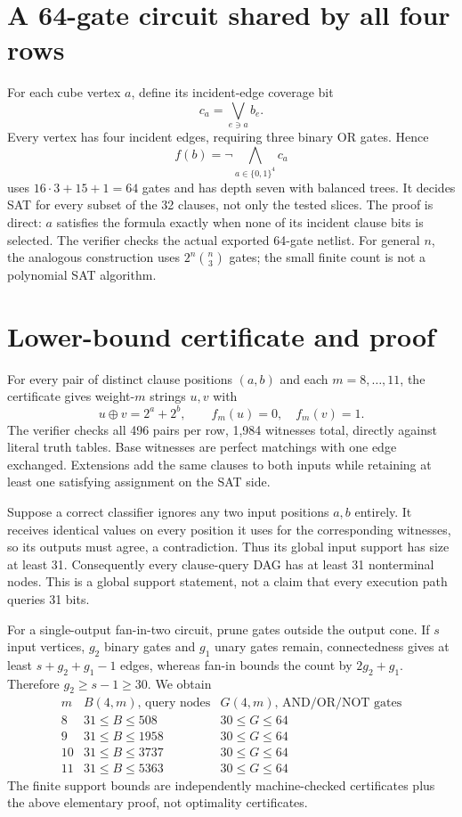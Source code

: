 \documentclass[11pt]{article}
\begin{document}
\section*{A 64-gate circuit shared by all four rows}
For each cube vertex $a$, define its incident-edge coverage bit
\[
c_a=\bigvee_{e\ni a} b_e.
\]
Every vertex has four incident edges, requiring three binary OR gates. Hence
\[
f(b)=\neg\bigwedge_{a\in\{0,1\}^4}c_a
\]
uses $16\cdot3+15+1=64$ gates and has depth seven with balanced trees.
It decides SAT for every subset of the 32 clauses, not only the tested slices.
The proof is direct: $a$ satisfies the formula exactly when none of its incident
clause bits is selected. The verifier checks the actual exported 64-gate netlist.
For general $n$, the analogous construction uses
$2^n\binom n3$ gates; the small finite count is not a polynomial SAT algorithm.

\section*{Lower-bound certificate and proof}
For every pair of distinct clause positions $(a,b)$ and each $m=8,\ldots,11$,
the certificate gives weight-$m$ strings $u,v$ with
\[
u\mathbin{\oplus}v=2^a+2^b,\qquad f_m(u)=0,\quad f_m(v)=1.
\]
The verifier checks all 496 pairs per row, 1,984 witnesses total, directly
against literal truth tables. Base witnesses are perfect matchings with one
edge exchanged. Extensions add the same clauses to both inputs while retaining
at least one satisfying assignment on the SAT side.

Suppose a correct classifier ignores any two input positions $a,b$ entirely.
It receives identical values on every position it uses for the corresponding
witnesses, so its outputs must agree, a contradiction. Thus its global input
support has size at least 31. Consequently every clause-query DAG has at least
31 nonterminal nodes. This is a global support statement, not a claim that every
execution path queries 31 bits.

For a single-output fan-in-two circuit, prune gates outside the output cone.
If $s$ input vertices, $g_2$ binary gates and $g_1$ unary gates remain, connectedness
gives at least $s+g_2+g_1-1$ edges, whereas fan-in bounds the count by
$2g_2+g_1$. Therefore $g_2\ge s-1\ge30$. We obtain
\[
\begin{array}{c|c|c}
m&B(4,m)\text{, query nodes}&G(4,m)\text{, AND/OR/NOT gates}\\\hline
8&31\le B\le508&30\le G\le64\\
9&31\le B\le1958&30\le G\le64\\
10&31\le B\le3737&30\le G\le64\\
11&31\le B\le5363&30\le G\le64
\end{array}
\]
The finite support bounds are independently machine-checked certificates plus
the above elementary proof, not optimality certificates.
\end{document}
